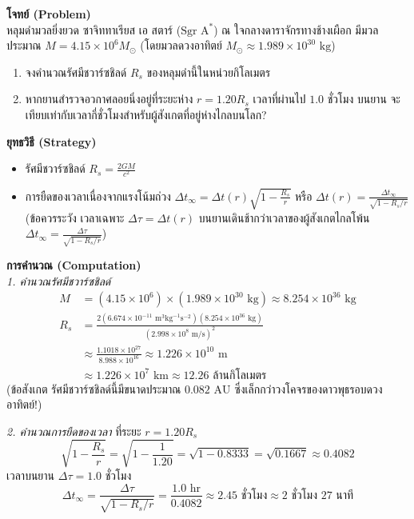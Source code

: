 \begin{psctexample}
\textbf{โจทย์ (Problem)} \\
หลุมดำมวลยิ่งยวด ซาจิททาเรียส เอ สตาร์ ($\text{Sgr A}^*$) ณ ใจกลางดาราจักรทางช้างเผือก มีมวลประมาณ $M = 4.15 \times 10^6 M_\odot$ (โดยมวลดวงอาทิตย์ $M_\odot \approx 1.989 \times 10^{30}\text{ kg}$)
\begin{enumerate}
    \item จงคำนวณรัศมีชวาร์ซชิลด์ $R_s$ ของหลุมดำนี้ในหน่วยกิโลเมตร
    \item หากยานสำรวจอวกาศลอยนิ่งอยู่ที่ระยะห่าง $r = 1.20 R_s$ เวลาที่ผ่านไป $1.0\text{ ชั่วโมง}$ บนยาน จะเทียบเท่ากับเวลากี่ชั่วโมงสำหรับผู้สังเกตที่อยู่ห่างไกลบนโลก?
\end{enumerate}

\textbf{ยุทธวิธี (Strategy)} \\
\begin{itemize}
    \item รัศมีชวาร์ซชิลด์ $R_s = \frac{2GM}{c^2}$
    \item การยืดของเวลาเนื่องจากแรงโน้มถ่วง $\Delta t_\infty = \Delta t(r) \sqrt{1 - \frac{R_s}{r}}$ หรือ $\Delta t(r) = \frac{\Delta t_\infty}{\sqrt{1 - R_s/r}}$ \\
    (ข้อควรระวัง เวลาเฉพาะ $\Delta \tau = \Delta t(r)$ บนยานเดินช้ากว่าเวลาของผู้สังเกตไกลโพ้น $\Delta t_\infty = \frac{\Delta \tau}{\sqrt{1 - R_s/r}}$)
\end{itemize}

\textbf{การคำนวณ (Computation)} \\
\textit{1. คำนวณรัศมีชวาร์ซชิลด์}
\begin{align}
M &= (4.15 \times 10^6) \times (1.989 \times 10^{30}\text{ kg}) \approx 8.254 \times 10^{36}\text{ kg} \\
R_s &= \frac{2 (6.674 \times 10^{-11}\text{ m}^3\text{kg}^{-1}\text{s}^{-2}) (8.254 \times 10^{36}\text{ kg})}{(2.998 \times 10^8\text{ m/s})^2} \\
&\approx \frac{1.1018 \times 10^{27}}{8.988 \times 10^{16}} \approx 1.226 \times 10^{10}\text{ m} \nonumber \\
&\approx 1.226 \times 10^7\text{ km} \approx 12.26\text{ ล้านกิโลเมตร}
\end{align}
(ข้อสังเกต รัศมีชวาร์ซชิลด์นี้มีขนาดประมาณ $0.082\text{ AU}$ ซึ่งเล็กกว่าวงโคจรของดาวพุธรอบดวงอาทิตย์!)

\textit{2. คำนวณการยืดของเวลา}
ที่ระยะ $r = 1.20 R_s$
\begin{equation}
\sqrt{1 - \frac{R_s}{r}} = \sqrt{1 - \frac{1}{1.20}} = \sqrt{1 - 0.8333} = \sqrt{0.1667} \approx 0.4082
\end{equation}
เวลาบนยาน $\Delta \tau = 1.0\text{ ชั่วโมง}$
\begin{equation}
\Delta t_\infty = \frac{\Delta \tau}{\sqrt{1 - R_s/r}} = \frac{1.0\text{ hr}}{0.4082} \approx 2.45\text{ ชั่วโมง} \approx 2\text{ ชั่วโมง } 27\text{ นาที}
\end{equation}


\end{psctexample}
